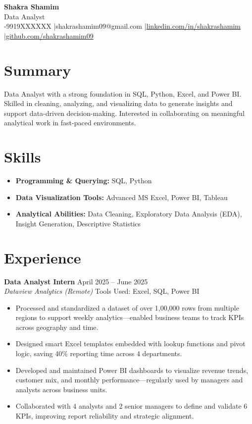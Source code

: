 \documentclass[11pt,a4paper]{article}
\begin{document}
\thispagestyle{empty}

\textbf{\LARGE Shakra Shamim} \\
Data Analyst \\
-9919XXXXXX \quad |\quad shakrashamim09@gmail.com \quad |\quad \href{https://linkedin.com/in/shakrashamim}{linkedin.com/in/shakrashamim} \quad |\quad \href{https://github.com/shakrashamim09}{github.com/shakrashamim09}

\section*{Summary}
Data Analyst with a strong foundation in SQL, Python, Excel, and Power BI. Skilled in cleaning, analyzing, and visualizing data to generate insights and support data-driven decision-making. Interested in collaborating on meaningful analytical work in fast-paced environments.

\section*{Skills}
\begin{itemize}[noitemsep]
\item \textbf{Programming \& Querying:} SQL, Python
\item \textbf{Data Visualization Tools:} Advanced MS Excel, Power BI, Tableau
\item \textbf{Analytical Abilities:} Data Cleaning, Exploratory Data Analysis (EDA), Insight Generation, Descriptive Statistics
\end{itemize}

\section*{Experience}
\textbf{Data Analyst Intern} \hfill April 2025 -- June 2025 \\
\textit{Dataview Analytics (Remote)} \quad Tools Used: Excel, SQL, Power BI
\begin{itemize}
\item Processed and standardized a dataset of over 1,00,000 rows from multiple regions to support weekly analytics—enabled business teams to track KPIs across geography and time.
\item Designed smart Excel templates embedded with lookup functions and pivot logic, saving 40\% reporting time across 4 departments.
\item Developed and maintained Power BI dashboards to visualize revenue trends, customer mix, and monthly performance—regularly used by managers and analysts across business units.
\item Collaborated with 4 analysts and 2 senior managers to define and validate 6 KPIs, improving report reliability and strategic alignment.
\end{itemize}
\end{document}
